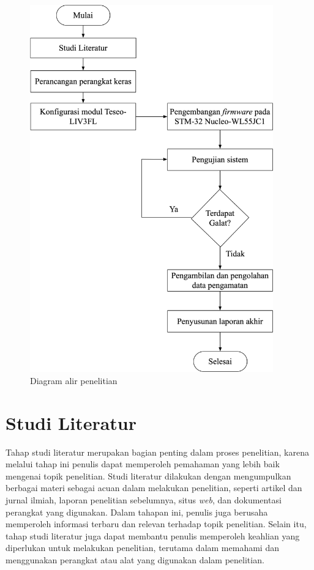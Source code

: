 \begin{figure}[H]
	\centering
	\includegraphics[width=10.5cm]{contents/chapter-3/diagram-alir-penelitian.png}
	\caption{Diagram alir penelitian}
	\label{Fig: diagram-alir-penelitian}
\end{figure}

\section{Studi Literatur}
Tahap studi literatur merupakan bagian penting dalam proses penelitian, karena melalui tahap ini penulis dapat memperoleh pemahaman yang lebih baik mengenai topik penelitian. Studi literatur dilakukan dengan mengumpulkan berbagai materi sebagai acuan dalam melakukan penelitian, seperti artikel dan jurnal ilmiah, laporan penelitian sebelumnya, situs \textit{web}, dan dokumentasi perangkat yang digunakan. Dalam tahapan ini, penulis juga berusaha memperoleh informasi terbaru dan relevan terhadap topik penelitian. Selain itu, tahap studi literatur juga dapat membantu penulis memperoleh keahlian yang diperlukan untuk melakukan penelitian, terutama dalam memahami dan menggunakan perangkat atau alat yang digunakan dalam penelitian. 

